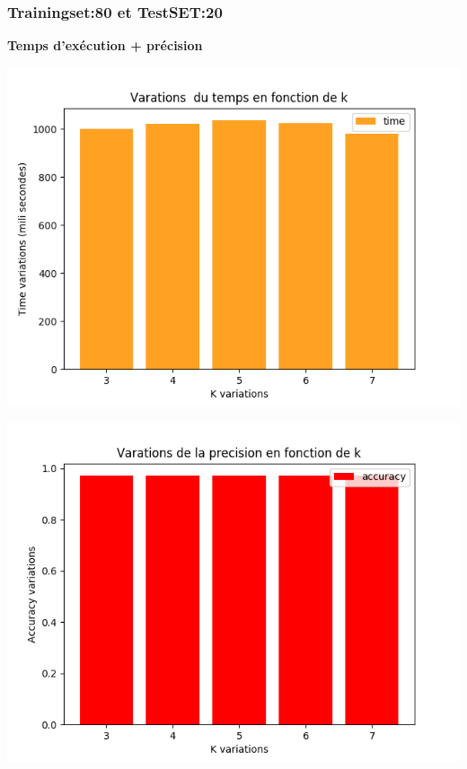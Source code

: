 \documentclass[12pt,a4paper,oneside]{book}
\begin{document}
\begin{frame}{}
\begin{minipage}[b]{0.5\linewidth}
			\label{labelname}%
		\end{minipage}
	\end{frame}
	
	
	\subsubsection{Trainingset:80 et TestSET:20}
	\textbf{Temps d'exécution + précision}\\
	\begin{frame}{}
		\centering
		\begin{minipage}[b]{0.5\linewidth}
			\includegraphics[scale=0.5]{image/data2:Train,80,Test,20time.png}
			\label{labelname}%
		\end{minipage}
		\hspace{0.5cm}
		\begin{minipage}[b]{0.5\linewidth}
			\includegraphics[scale=0.5]{image/data2:Train,80,Test,20:accuracy.png}%
			\label{labelname}%
		\end{minipage}
	\end{frame}
	
\end{document}
